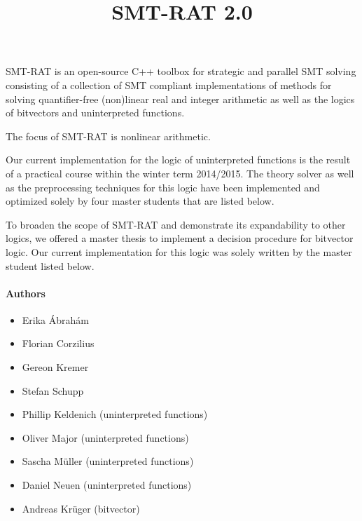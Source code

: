 \documentclass{article}
\title{SMT-RAT 2.0}
\begin{document}
\maketitle

SMT-RAT is an open-source C++ toolbox for strategic and parallel SMT solving
consisting of a collection of SMT compliant implementations of methods for
solving quantifier-free (non)linear real and integer arithmetic as well as
the logics of bitvectors and uninterpreted functions.


The focus of SMT-RAT is nonlinear arithmetic.

Our current implementation for the logic of uninterpreted functions is the
result of a practical course within the winter term 2014/2015. The theory
solver as well as the preprocessing techniques for this logic have been
implemented and optimized solely by four master students that are listed
below.

To broaden the scope of SMT-RAT and demonstrate its expandability to other
logics, we offered a master thesis to implement a decision procedure for
bitvector logic. Our current implementation for this logic was solely
written by the master student listed below.

\paragraph{Authors}
\begin{itemize}
\item Erika \'Abrah\'am
\item Florian Corzilius
\item Gereon Kremer
\item Stefan Schupp
\item Phillip Keldenich (uninterpreted functions)
\item Oliver Major (uninterpreted functions)
\item Sascha Müller (uninterpreted functions)
\item Daniel Neuen (uninterpreted functions)
\item Andreas Krüger (bitvector)
\end{itemize}
\end{document}
